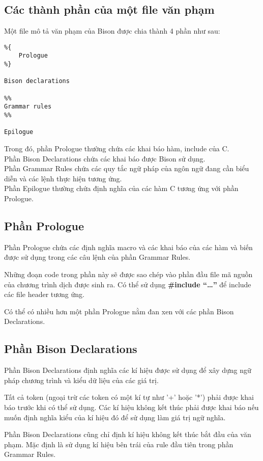 \documentclass[../report.tex]{subfiles}
\begin{document}
\subsection{Các thành phần của một file văn phạm}
Một file mô tả văn phạm của Bison được chia thành 4 phần như sau: 
\cite{grammar-file}
\begin{lstlisting}
%{
    Prologue
%}

Bison declarations

%%
Grammar rules
%%

Epilogue
\end{lstlisting}
Trong đó, phần Prologue thường 
chứa các khai báo hàm, include của C. \\
Phần Bison Declarations chứa các khai báo được Bison sử dụng. \\
Phần Grammar Rules chứa các quy tắc ngữ pháp của ngôn ngữ đang cần biểu diễn và 
các lệnh thực hiện tương ứng. \\
Phần Epilogue thường chứa định nghĩa của các hàm C tương ứng với phần 
Prologue.

\subsection{Phần Prologue}
Phần Prologue chứa các định nghĩa macro và các khai báo của các 
hàm và biến được sử dụng trong các câu lệnh của phần Grammar Rules. 
\cite{prologue}

Những đoạn code trong phần này sẽ được sao chép vào phần đầu 
file mã nguồn của chương trình dịch được sinh ra. Có thể sử dụng 
\textbf{\#include ``\ldots''} để include các file header tương ứng. 

Có thể có nhiều hơn một phần Prologue nằm đan xen với các phần Bison Declarations.

\subsection{Phần Bison Declarations}
Phần Bison Declarations định nghĩa các kí hiệu được sử dụng 
để xây dựng ngữ pháp chương trình và kiểu dữ liệu của các giá trị. 
\cite{bison-declarations}

Tất cả token (ngoại trừ các token có một kí tự như '+' hoặc '*') phải được khai báo trước khi có thể sử dụng. 
Các kí hiệu không kết thúc phải được khai báo nếu muốn định nghĩa 
kiểu của kí hiệu đó để sử dụng làm giá trị ngữ nghĩa. 

Phần Bison Declarations cũng chỉ định kí hiệu không kết thúc bắt đầu
của văn phạm. Mặc định là sử dụng kí hiệu bên trái 
của rule đầu tiên trong phần Grammar Rules. 
\end{document}
